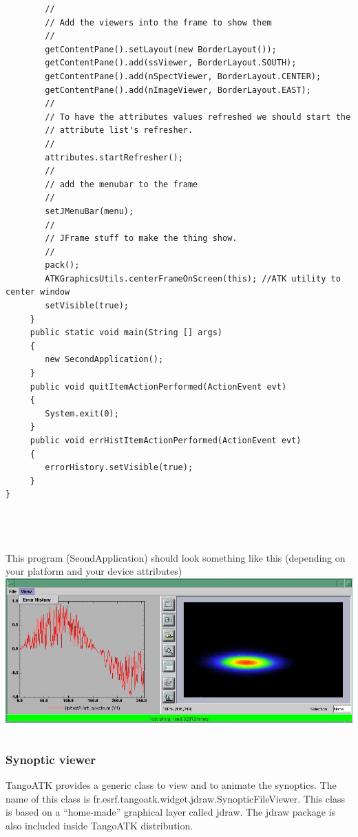 \begin{verbatim}
        //
        // Add the viewers into the frame to show them
        //
        getContentPane().setLayout(new BorderLayout());
        getContentPane().add(ssViewer, BorderLayout.SOUTH);
        getContentPane().add(nSpectViewer, BorderLayout.CENTER);
        getContentPane().add(nImageViewer, BorderLayout.EAST);
        //
        // To have the attributes values refreshed we should start the
        // attribute list's refresher.
        //
        attributes.startRefresher();
        //
        // add the menubar to the frame
        //
        setJMenuBar(menu);
        //
        // JFrame stuff to make the thing show.
        //
        pack();
        ATKGraphicsUtils.centerFrameOnScreen(this); //ATK utility to center window
        setVisible(true);
     }
     public static void main(String [] args)
     {
        new SecondApplication();
     }
     public void quitItemActionPerformed(ActionEvent evt)
     {
        System.exit(0);
     }
     public void errHistItemActionPerformed(ActionEvent evt)
     {
        errorHistory.setVisible(true);
     }
}




\end{verbatim}


This program (SeondApplication) should look something like this (depending
on your platform and your device attributes)\\


\includegraphics[scale=0.5]{atk/img/prog_guide_exple2}
\begin{verbatim}

\end{verbatim}

\subsubsection{Synoptic viewer}

TangoATK provides a generic class to view and to animate the synoptics.
The name of this class is fr.esrf.tangoatk.widget.jdraw.SynopticFileViewer.
This class is based on a ``home-made'' graphical layer called jdraw.
The jdraw package is also included inside TangoATK distribution.


